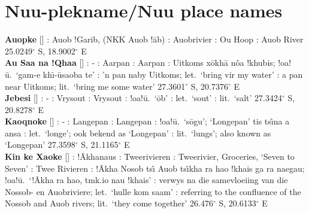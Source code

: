\newpage


\markboth{}{}
\section{N\textvertline{}uu-plekname/N\textvertline{}uu place names}
\label{s:placenames}
\markboth{}{}

\textbf{Auopke} [] : Auob !Garib, (NKK
Auob !\={a}b) : Auobrivier
: Ou Hoop :
Auob River 25.0249$^{\circ}$ S, 18.9002$^{\circ}$ E \\

\textbf{Au Saa na !Qhaa} [] :
- : Aarpan : Aarpan :
Uitkoms x\={o}\textvertline{}kh\={a} \textdoublebarpipe{}n\^{o}a
!khubis; !oa!\={u}.\ `\textdoublevertline{}gam-e
\textvertline{}kh\={\i}-\={u}saoba te' : 'n pan naby
Uitkoms; let.\ `bring vir my water' : a pan near
Uitkoms; lit.\ `bring me some water' 27.3601$^{\circ}$ S,
20.7376$^{\circ}$ E \\

\textbf{Jebesi} [] : -
: Vrysout : Vrysout :
!oa!\={u}.\ `\textdoublebarpipe{}\={o}b' : let.\ `sout'
: lit.\ `salt' 27.3424$^{\circ}$ S, 20.8278$^{\circ}$ E
\\

\textbf{Ka\textdoublevertline{}oqnoke}
[] : -
: Langepan : Langepan :
!oa!\={u}.\ `s\={o}gu'; `Longepan' tis ts\^{\i}na a
\textdoublebarpipe{}ansa : let.\ `longe'; ook bekend as
`Longepan' : lit.\ `lungs'; also known as `Longepan'
27.3598$^{\circ}$ S, 21.1165$^{\circ}$ E \\

\textbf{Kin ke Xaoke} [] :
!\={A}kha\textdoublebarpipe{}naus : Tweerivieren
: Tweerivier, Groceries,
`Seven to Seven' : Twee Rivieren :
!\={A}kha \textdoublebarpipe{}Nosob ts\^{\i} Auob ts\^{\i}kha ra
\textvertline{}hao !khais \textdoublevertline{}ga ra
\textdoublevertline{}nae\textdoublevertline{}gau; !oa!\={u}.\
`!\={A}kha ra \textvertline{}hao, tmk.io \textdoublebarpipe{}nau
!khais' \underbar{Afr}: verwys na die samevloeiing van die Nossob- en
Auobriviere; let.\ `hulle kom saam' \underbar{Eng}: referring to the
confluence of the Nossob and Auob rivers; lit.\ `they come together'
26.476$^{\circ}$ S, 20.6133$^{\circ}$ E\\

